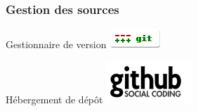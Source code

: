 \begin{frame}\frametitle{Gestion des sources}
\begin{centering}
	\begin{minipage}[c]{.6\linewidth}
		\begin{beamerboxesrounded}[shadow=true,center]{Gestionnaire de version}
			\centering
			\includegraphics[width=.4\linewidth]{../image/gitLogo.png}\hfil
		\end{beamerboxesrounded}
	\end{minipage}
	\vfill
	\begin{minipage}[c]{.6\linewidth}
		\begin{beamerboxesrounded}[shadow=true,center]{Hébergement de dépôt}
			\centering
			\includegraphics[width=.3\linewidth]{../image/githubLogo.png}
		\end{beamerboxesrounded}
	\end{minipage}
	\vfill
\end{centering}
\end{frame}
